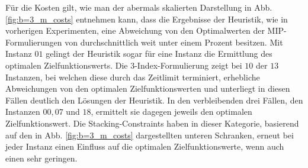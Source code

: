 Für die Kosten gilt, wie man der abermals skalierten Darstellung in Abb. \ref{fig:b=3_m_costs} entnehmen kann, dass die Ergebnisse der Heuristik, wie in vorherigen Experimenten, eine Abweichung von den Optimalwerten der MIP-Formulierungen von durchschnittlich weit unter einem Prozent besitzen. Mit Instanz $01$ gelingt der Heuristik sogar für eine Instanz die
Ermittlung des optimalen Zielfunktionswerts.
Die 3-Index-Formulierung zeigt bei $10$ der $13$ Instanzen, bei welchen diese durch das Zeitlimit
terminiert, erhebliche Abweichungen von den optimalen Zielfunktionswerten und unterliegt in diesen Fällen
deutlich den Lösungen der Heuristik. In den verbleibenden drei Fällen, den Instanzen $00, 07$ und $18$, ermittelt
sie dagegen jeweils den optimalen Zielfunktionswert. Die Stacking-Constraints haben in dieser Kategorie,
basierend auf den in Abb. \ref{fig:b=3_m_costs} dargestellten unteren Schranken, erneut bei jeder Instanz einen Einfluss auf die optimalen Zielfunktionswerte, wenn auch einen sehr geringen.

